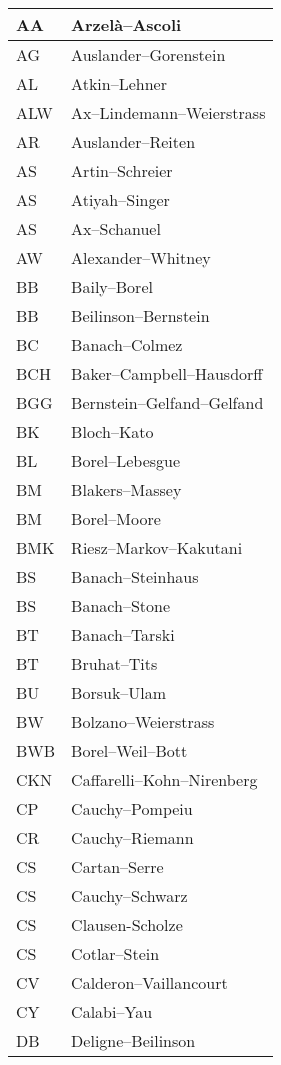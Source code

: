 \documentclass{amsart}
\numberwithin{equation}{section}
\theoremstyle{plain}
\numberwithin{equation}{section}
\theoremstyle{remark}
\begin{document}
\begin{longtable}{l|l}
\hline
AA & Arzelà--Ascoli\\ \hline
AG & Auslander--Gorenstein\\ \hline
AL & Atkin--Lehner\\ \hline
ALW &  Ax--Lindemann--Weierstrass\\ \hline
AR & Auslander--Reiten  \\ \hline
AS & Artin--Schreier\\ \hline
AS & Atiyah--Singer\\ \hline
AS & Ax--Schanuel\\ \hline
AW & Alexander--Whitney\\ \hline
BB & Baily--Borel\\ \hline
BB & Beilinson--Bernstein\\ \hline
BC & Banach--Colmez\\ \hline
BCH & Baker--Campbell--Hausdorff\\ \hline
BGG & Bernstein--Gelfand--Gelfand\\ \hline
BK & Bloch--Kato\\ \hline
BL & Borel--Lebesgue\\ \hline
BM  & Blakers--Massey\\ \hline
BM & Borel--Moore\\ \hline
BMK & Riesz--Markov--Kakutani\\ \hline
BS & Banach--Steinhaus\\ \hline
BS & Banach--Stone\\ \hline
BT & Banach--Tarski\\ \hline
BT & Bruhat--Tits\\ \hline
BU & Borsuk--Ulam\\ \hline
BW & Bolzano--Weierstrass\\ \hline
BWB & Borel--Weil--Bott\\ \hline
CKN & Caffarelli--Kohn--Nirenberg\\ \hline
CP &  Cauchy--Pompeiu\\ \hline
CR & Cauchy--Riemann\\ \hline
CS & Cartan--Serre\\ \hline
CS & Cauchy--Schwarz\\ \hline
CS & Clausen-Scholze\\ \hline
CS & Cotlar--Stein\\ \hline
CV & Calderon--Vaillancourt\\ \hline
CY & Calabi--Yau\\ \hline
DB & Deligne--Beilinson\\ \hline

\end{longtable}
\end{document}
